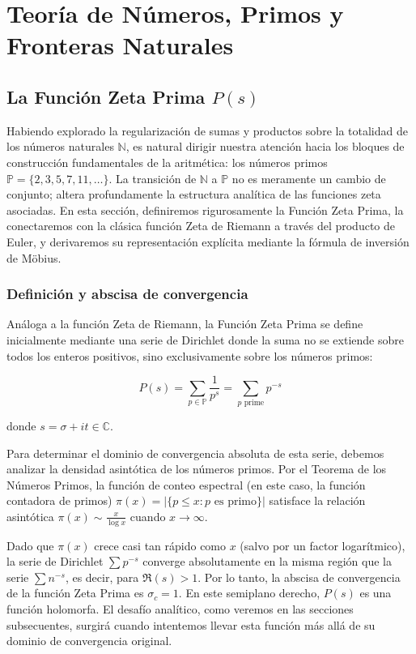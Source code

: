 \chapter{Teoría de Números, Primos y Fronteras Naturales}

\section{La Función Zeta Prima $P(s)$}

Habiendo explorado la regularización de sumas y productos sobre la totalidad de los números naturales $\mathbb{N}$, es natural dirigir nuestra atención hacia los bloques de construcción fundamentales de la aritmética: los números primos $\mathbb{P} = \{2, 3, 5, 7, 11, \dots\}$. La transición de $\mathbb{N}$ a $\mathbb{P}$ no es meramente un cambio de conjunto; altera profundamente la estructura analítica de las funciones zeta asociadas. En esta sección, definiremos rigurosamente la Función Zeta Prima, la conectaremos con la clásica función Zeta de Riemann a través del producto de Euler, y derivaremos su representación explícita mediante la fórmula de inversión de Möbius.

\subsection{Definición y abscisa de convergencia}

Análoga a la función Zeta de Riemann, la Función Zeta Prima se define inicialmente mediante una serie de Dirichlet donde la suma no se extiende sobre todos los enteros positivos, sino exclusivamente sobre los números primos:

$$ P(s) = \sum_{p \in \mathbb{P}} \frac{1}{p^s} = \sum_{p \text{ prime}} p^{-s} $$

donde $s = \sigma + it \in \mathbb{C}$. 

Para determinar el dominio de convergencia absoluta de esta serie, debemos analizar la densidad asintótica de los números primos. Por el Teorema de los Números Primos, la función de conteo espectral (en este caso, la función contadora de primos) $\pi(x) = |\{p \le x : p \text{ es primo}\}|$ satisface la relación asintótica $\pi(x) \sim \frac{x}{\log x}$ cuando $x \to \infty$. 

Dado que $\pi(x)$ crece casi tan rápido como $x$ (salvo por un factor logarítmico), la serie de Dirichlet $\sum p^{-s}$ converge absolutamente en la misma región que la serie $\sum n^{-s}$, es decir, para $\Re(s) > 1$. Por lo tanto, la abscisa de convergencia de la función Zeta Prima es $\sigma_c = 1$. En este semiplano derecho, $P(s)$ es una función holomorfa. El desafío analítico, como veremos en las secciones subsecuentes, surgirá cuando intentemos llevar esta función más allá de su dominio de convergencia original.


